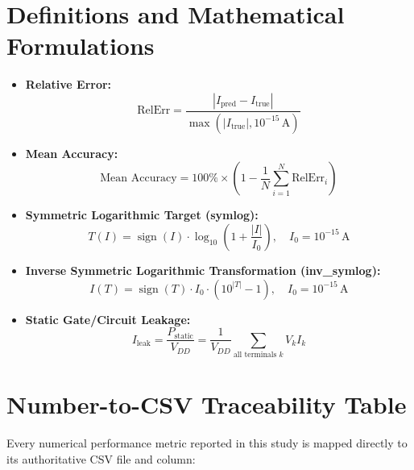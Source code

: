\documentclass[11pt,a4paper]{article}
\numberwithin{table}{section}
\numberwithin{figure}{section}
\begin{document}
\section{Definitions and Mathematical Formulations}
\begin{itemize}[noitemsep]
    \item \textbf{Relative Error:}
    \begin{equation}
    \text{RelErr} = \frac{|I_{\mathrm{pred}} - I_{\mathrm{true}}|}{\max(|I_{\mathrm{true}}|, 10^{-15}\,\mathrm{A})}
    \end{equation}
    \item \textbf{Mean Accuracy:}
    \begin{equation}
    \text{Mean Accuracy} = 100\% \times \left(1 - \frac{1}{N}\sum_{i=1}^N \text{RelErr}_i\right)
    \end{equation}
    \item \textbf{Symmetric Logarithmic Target (symlog):}
    \begin{equation}
    T(I) = \operatorname{sign}(I)\cdot \log_{10}\left(1 + \frac{|I|}{I_0}\right), \quad I_0 = 10^{-15}\,\mathrm{A}
    \end{equation}
    \item \textbf{Inverse Symmetric Logarithmic Transformation (inv\_symlog):}
    \begin{equation}
    I(T) = \operatorname{sign}(T) \cdot I_0 \cdot \left(10^{|T|} - 1\right), \quad I_0 = 10^{-15}\,\mathrm{A}
    \end{equation}
    \item \textbf{Static Gate/Circuit Leakage:}
    \begin{equation}
    I_{\mathrm{leak}} = \frac{P_{\mathrm{static}}}{V_{DD}} = \frac{1}{V_{DD}} \sum_{\text{all terminals } k} V_k I_k
    \end{equation}
\end{itemize}

\section{Number-to-CSV Traceability Table}
Every numerical performance metric reported in this study is mapped directly to its authoritative CSV file and column:
\end{document}

